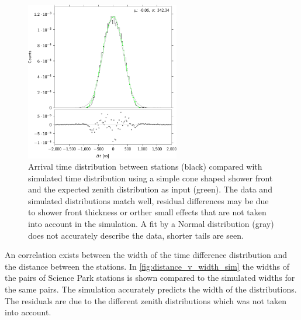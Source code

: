 \begin{figure}
    \centering
    \includegraphics[width=0.6\textwidth]
                    {plots/cluster/dt_ref504_509_dist_sim}
    \caption{Arrival time distribution between stations (black) compared with simulated time distribution using a simple cone shaped shower front and the expected zenith distribution as input (green). The data and simulated distributions match well, residual differences may be due to shower front thickness or orther small effects that are not taken into account in the simulation. A fit by a Normal distribution (gray) does not accurately describe the data, shorter tails are seen.}
    \label{fig:dt_ref504_509_dist_sim}
\end{figure}

An correlation exists between the width of the time difference distribution and the distance between the stations. In \cref{fig:distance_v_width_sim} the widths of the pairs of Science Park stations is shown compared to the simulated widths for the same pairs. The simulation accurately predicts the width of the distributions. The residuals are due to the different zenith distributions which was not taken into account.

